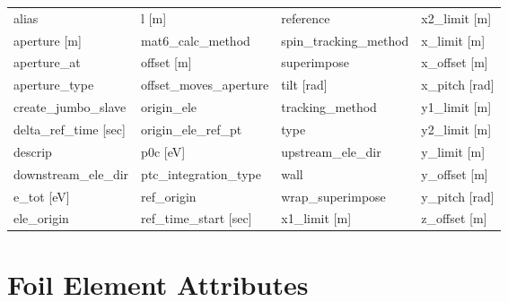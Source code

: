  \begin{tabular}{llll} \toprule
alias                            & l [m]                            & reference                        & x2_limit [m]                     \\
aperture [m]                     & mat6_calc_method                 & spin_tracking_method             & x_limit [m]                      \\
aperture_at                      & offset [m]                       & superimpose                      & x_offset [m]                     \\
aperture_type                    & offset_moves_aperture            & tilt [rad]                       & x_pitch [rad]                    \\
create_jumbo_slave               & origin_ele                       & tracking_method                  & y1_limit [m]                     \\
delta_ref_time [sec]             & origin_ele_ref_pt                & type                             & y2_limit [m]                     \\
descrip                          & p0c [eV]                         & upstream_ele_dir                 & y_limit [m]                      \\
downstream_ele_dir               & ptc_integration_type             & wall                             & y_offset [m]                     \\
e_tot [eV]                       & ref_origin                       & wrap_superimpose                 & y_pitch [rad]                    \\
ele_origin                       & ref_time_start [sec]             & x1_limit [m]                     & z_offset [m]                     \\
 \bottomrule
 \end{tabular}
 \vfill
 
 \section{Foil Element Attributes}
 \label{s:list.foil}
 
